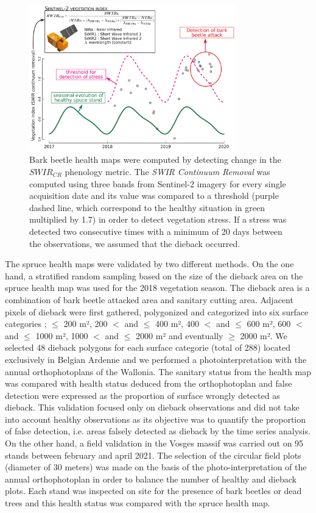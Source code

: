 \documentclass[3p,procedia]{elsarticle}
\begin{document}
\begin{figure}[htbp] 
	\centering
	\includegraphics[width=0.8\textwidth]{fctHarmo.png}
	\caption{Bark beetle health maps were computed by detecting change in the $SWIR_{CR}$ phenology metric. The \textit{SWIR Continuum Removal} was computed using three bands from Sentinel-2 imagery for every single acquisition date and its value was compared to a threshold (purple dashed line, which correspond to the healthy situation in green multiplied by 1.7) in order to detect vegetation stress. If a stress was detected two consecutive times with a minimum of 20 days between the observations, we assumed that the dieback occurred.}
	\label{fig:harmo}
\end{figure}

The spruce health maps were validated by two different methods.
On the one hand, a stratified random sampling based on the size of the dieback area on the spruce health map was used for the 2018 vegetation season.
The dieback area is a combination of bark beetle attacked area and sanitary cutting area.
Adjacent pixels of dieback were first gathered, polygonized and categorized into six surface categories ; $\leq$ 200 m²,  200 $<$ and $\leq$ 400 m², 400 $<$ and $\leq$ 600 m², 600 $<$ and $\leq$ 1000 m², 1000 $<$ and $\leq$ 2000 m² and eventually $\geq$ 2000 m².
We selected 48 dieback polygons for each surface categorie (total of 288) located exclusively in Belgian Ardenne and we performed a photointerpretation with the annual orthophotoplans of the Wallonia. 
The sanitary status from the health map was compared with health status deduced from the orthophotoplan and false detection were expressed as the proportion of surface wrongly detected as dieback.
This validation focused only on dieback observations and did not take into account healthy observations as its objective was to quantify the proportion of false detection, i.e. areas falsely detected as dieback by the time series analysis.
On the other hand, a field validation in the Vosges massif was carried out on 95 stands between february and april 2021.
The selection of the circular field plots (diameter of 30 meters) was made on the basis of the photo-interpretation of the annual orthophotoplan in order to balance the number of healthy and dieback plots. 
Each stand was inspected on site for the presence of bark beetles or dead trees and this health status was compared with the spruce health map. 
\end{document}
